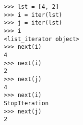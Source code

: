 \begin{lstlisting}
>>> lst = [4, 2]
>>> i = iter(lst)
>>> j = iter(lst)
>>> i
<list_iterator object>
>>> next(i)
4
>>> next(i)
2
>>> next(j)
4
>>> next(i)
StopIteration
>>> next(j)
2
\end{lstlisting}
